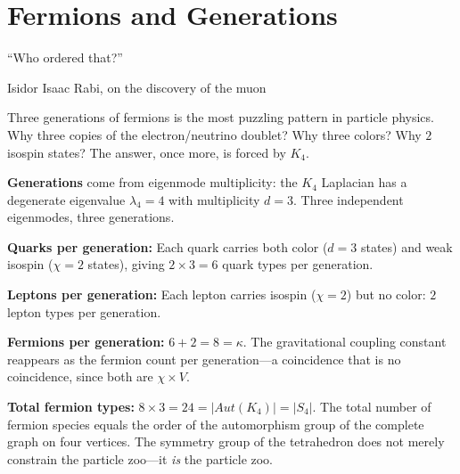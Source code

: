\documentclass[11pt,a4paper]{book}
\def\mathrm#1{#1}%
\begin{document}
\chapter{Fermions and Generations}
\label{ch:fermions}

\epigraph{``Who ordered that?''}{Isidor Isaac Rabi, on the discovery of the muon}

Three generations of fermions is the most puzzling pattern in particle physics. Why three copies of the electron/neutrino doublet? Why three colors? Why $2$ isospin states? The answer, once more, is forced by $K_4$.

\textbf{Generations} come from eigenmode multiplicity: the $K_4$ Laplacian has a degenerate eigenvalue $\lambda_4 = 4$ with multiplicity $d = 3$. Three independent eigenmodes, three generations.

\textbf{Quarks per generation:} Each quark carries both color ($d = 3$ states) and weak isospin ($\chi = 2$ states), giving $2 \times 3 = 6$ quark types per generation.

\textbf{Leptons per generation:} Each lepton carries isospin ($\chi = 2$) but no color: $2$ lepton types per generation.

\textbf{Fermions per generation:} $6 + 2 = 8 = \kappa$. The gravitational coupling constant reappears as the fermion count per generation---a coincidence that is no coincidence, since both are $\chi \times V$.

\textbf{Total fermion types:} $8 \times 3 = 24 = |\mathrm{Aut}(K_4)| = |S_4|$. The total number of fermion species equals the order of the automorphism group of the complete graph on four vertices. The symmetry group of the tetrahedron does not merely constrain the particle zoo---it \emph{is} the particle zoo.
\end{document}
